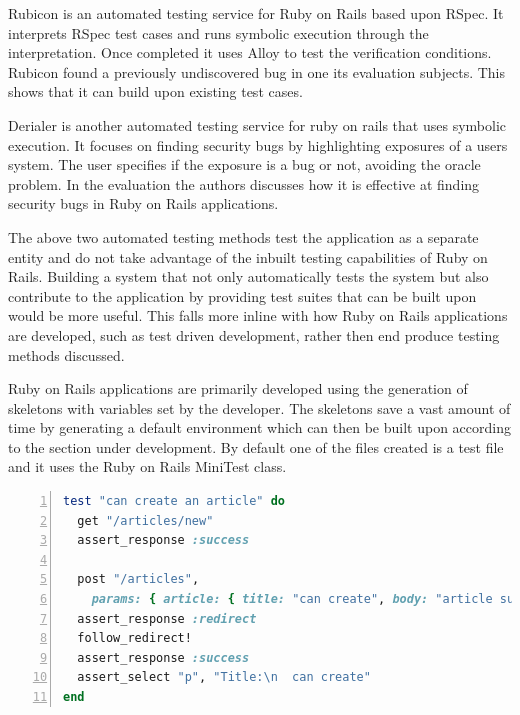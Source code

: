 \documentclass[a4paper,12pt]{article}
\begin{document}
\par Rubicon\cite{near2012rubicon} is an automated testing service for Ruby on Rails based upon RSpec. It interprets RSpec test cases and runs symbolic execution through the interpretation. Once completed it uses Alloy to test the verification conditions. Rubicon found a previously undiscovered bug in one its evaluation subjects. This shows that it can build upon existing test cases.
\vspace{3mm}
\par Derialer\cite{near2014derailer} is another automated testing service for ruby on rails that uses symbolic execution. It focuses on finding security bugs by highlighting exposures of a users system. The user specifies if the exposure is a bug or not, avoiding the oracle problem. In the evaluation the authors discusses how it is effective at finding security bugs in  Ruby on Rails applications.
\vspace{3mm}
\par The above two automated testing methods test the application as a separate entity and do not take advantage of the inbuilt testing capabilities of Ruby on Rails. Building a system that not only automatically tests the system but also contribute to the application by providing test suites that can be built upon would be more useful. This falls more inline with how Ruby on Rails applications are developed, such as test driven development, rather then end produce testing methods discussed.
\vspace{3mm}
\par Ruby on Rails applications are primarily developed using the generation of skeletons with variables set by the developer. The skeletons save a vast amount of time by generating a default environment which can then be built upon according to the section under development. By default one of the files created is a test file and it uses the Ruby on Rails MiniTest\cite{railsTest} class.
\vspace{3mm}
\begin{lstlisting}[frame=single,numbers=left,language = ruby,caption= {An example of a miniTest test case, sourced from miniTest guide\cite{railsTest}}, label={code:minitest}]
test "can create an article" do
  get "/articles/new"
  assert_response :success
 
  post "/articles",
    params: { article: { title: "can create", body: "article successfully." } }
  assert_response :redirect
  follow_redirect!
  assert_response :success
  assert_select "p", "Title:\n  can create"
end
\end{lstlisting}
\end{document}
